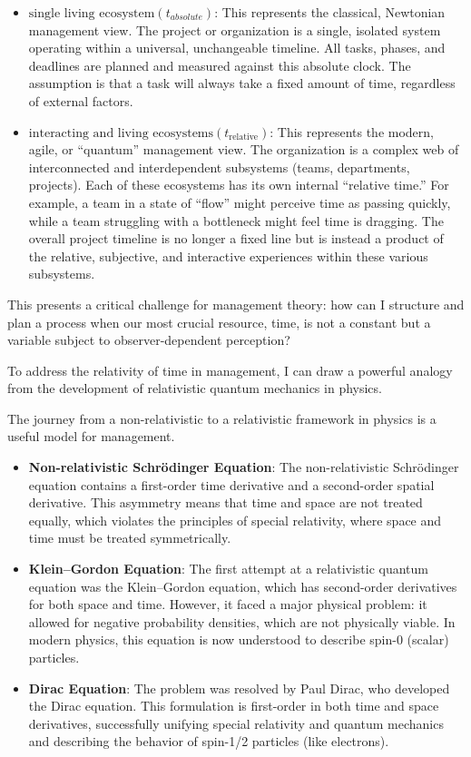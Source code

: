 \documentclass{article}
\begin{document}
\begin{itemize}
\item $\text{single living ecosystem}(t_{absolute})$: This represents the classical, Newtonian management view. The project or organization is a single, isolated system operating within a universal, unchangeable timeline. All tasks, phases, and deadlines are planned and measured against this absolute clock. The assumption is that a task will always take a fixed amount of time, regardless of external factors.

\item $\text{interacting and living ecosystems}(t_{\text{relative}})$: This represents the modern, agile, or ``quantum'' management view. The organization is a complex web of interconnected and interdependent subsystems (teams, departments, projects). Each of these ecosystems has its own internal ``relative time.'' For example, a team in a state of ``flow'' might perceive time as passing quickly, while a team struggling with a bottleneck might feel time is dragging. The overall project timeline is no longer a fixed line but is instead a product of the relative, subjective, and interactive experiences within these various subsystems.

\end{itemize}
 
 This presents a critical challenge for management theory: how can I structure and plan a process when our most crucial resource, time, is not a constant but a variable subject to observer-dependent perception?
 

 
 To address the relativity of time in management, I can draw a powerful analogy from the development of relativistic quantum mechanics in physics.
 

 
 The journey from a non-relativistic to a relativistic framework in physics is a useful model for management.
 
 \begin{itemize}
 	\item \textbf{Non-relativistic Schrödinger Equation}: The non-relativistic Schrödinger equation contains a first-order time derivative and a second-order spatial derivative. This asymmetry means that time and space are not treated equally, which violates the principles of special relativity, where space and time must be treated symmetrically.
 	\item \textbf{Klein–Gordon Equation}: The first attempt at a relativistic quantum equation was the Klein–Gordon equation, which has second-order derivatives for both space and time. However, it faced a major physical problem: it allowed for negative probability densities, which are not physically viable. In modern physics, this equation is now understood to describe spin-0 (scalar) particles.
 	\item \textbf{Dirac Equation}: The problem was resolved by Paul Dirac, who developed the Dirac equation. This formulation is first-order in both time and space derivatives, successfully unifying special relativity and quantum mechanics and describing the behavior of spin-1/2 particles (like electrons).
 \end{itemize}
 
\end{document}

